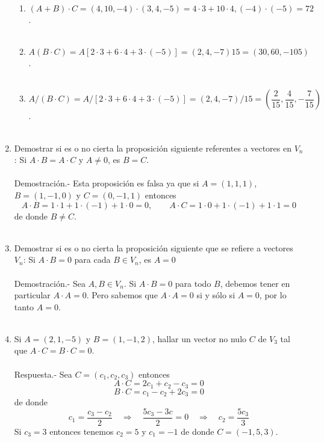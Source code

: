 \begin{enumerate}[\bfseries 1.]
\begin{enumerate}[\bfseries (a)]
    \item $(A+B)\cdot C = (4,10,-4)\cdot (3,4,-5) = 4\cdot 3 + 10 \cdot 4, (-4)\cdot (-5) = 72$.\\\\

    \item $A(B\cdot C) = A\left[2\cdot 3 + 6\cdot 4 + 3\cdot (-5)\right] = (2,4,-7)15 = (30,60,-105)$.\\\\

    \item $A/(B\cdot C) = A/\left[2\cdot 3 + 6\cdot 4 + 3\cdot (-5)\right] = (2,4,-7)/15 = \left(\dfrac{2}{15},\dfrac{4}{15},-\dfrac{7}{15}\right)$.\\\\

\end{enumerate}

\item Demostrar si es o no cierta la proposición siguiente referentes a vectores en $V_n$: Si $A\cdot B=A\cdot C$ y $A\neq 0$, es $B=C$.\\\\
    Demostración.-\; Esta proposición es falsa ya que si $A=(1,1,1)$, $B=(1,-1,0)$ y $C=(0,-1,1)$ entonces $$A\cdot B = 1\cdot 1 + 1\cdot(-1)+1\cdot 0 = 0, \qquad A\cdot C = 1\cdot 0 + 1\cdot(-1)+1\cdot 1 = 0$$
    de donde $B\neq C$.\\\\ 

\item Demostrar si es o no cierta la proposición siguiente que se refiere a vectores $V_n$: Si $A\cdot B = 0$ para cada $B \in V_n$, es $A=0$ \\\\ 
    Demostración.-\; Sea $A,B \in V_n$. Si $A\cdot B = 0$ para todo $B$,  debemos tener en particular $A\cdot A = 0$. Pero sabemos que $A\cdot A = 0$ si y sólo si $A=0$, por lo tanto $A=0$.\\\\

\item Si $A=(2,1,-5)$ y $B=(1,-1,2)$, hallar un vector no nulo $C$ de $V_3$ tal que $A\cdot C=B\cdot C=0$.\\\\
    Respuesta.-\; Sea $C=(c_1,c_2,c_3)$ entonces $$A\cdot C = 2c_1+c_2-c_3=0$$ $$B\cdot C = c_1-c_2+2c_3 = 0$$
	de donde $$c_1=\dfrac{c_3-c_2}{2}\quad \Longrightarrow \quad \dfrac{5c_3 - 3c}{2}=0 \quad \Longrightarrow \quad c_2 = \dfrac{5c_3}{3}$$
	Si $c_3=3$ entonces tenemos $c_2=5$ y $c_1=-1$ de donde $C=(-1,5,3)$.\\\\


\end{enumerate}
